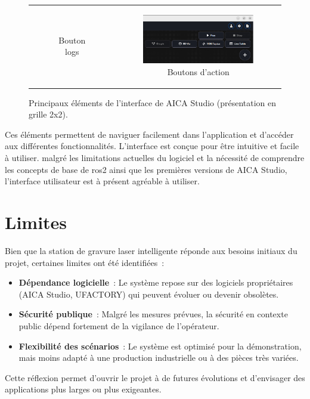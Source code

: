 \begin{figure}[H]
\begin{tabular}{cc}
\begin{subfigure}{0.45\textwidth}
            \caption{Bouton logs}
            \label{fig:aica_logs}
        \end{subfigure} &
        \begin{subfigure}{0.45\textwidth}
            \centering
            \includegraphics[width=0.9\linewidth]{assets/figures/AICA_play_pause.png}
            \caption{Boutons d'action}
            \label{fig:aica_play_pause}
        \end{subfigure}
    \end{tabular}
    \caption{Principaux éléments de l'interface de AICA Studio (présentation en grille 2x2).}
    \label{fig:aica_interface_elements}
\end{figure}

Ces éléments permettent de naviguer facilement dans l'application et d'accéder aux différentes fonctionnalités. L'interface est conçue pour être intuitive et facile à utiliser. malgré les limitations actuelles du logiciel et la nécessité de comprendre les concepts de base de \gls{ros2} ainsi que les premières versions de AICA Studio, l'interface utilisateur est à présent agréable à utiliser.

\section{Limites}
Bien que la station de gravure laser intelligente réponde aux besoins initiaux du projet, certaines limites ont été identifiées :
\begin{itemize}
    \item \textbf{Dépendance logicielle} : Le système repose sur des logiciels propriétaires (AICA Studio, UFACTORY) qui peuvent évoluer ou devenir obsolètes.
    \item \textbf{Sécurité publique} : Malgré les mesures prévues, la sécurité en contexte public dépend fortement de la vigilance de l'opérateur.
    \item \textbf{Flexibilité des scénarios} : Le système est optimisé pour la démonstration, mais moins adapté à une production industrielle ou à des pièces très variées.
\end{itemize}

Cette réflexion permet d'ouvrir le projet à de futures évolutions et d'envisager des applications plus larges ou plus exigeantes.



